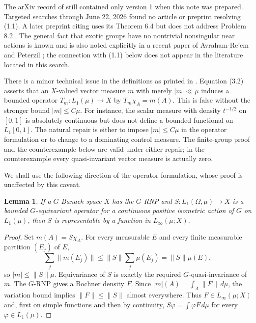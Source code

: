 \documentclass[11pt]{article}
\newtheorem{lemma}[theorem]{Lemma}
\theoremstyle{remark}
\begin{document}
The arXiv record of \cite{DDJR} still contained only version 1 when this note
was prepared.  Targeted searches through June 22, 2026 found no article or
preprint resolving (1.1).  A later preprint citing \cite{DDJR} uses its
Theorem 6.4 but does not address Problem 8.2 \cite{Daugavet}.  The general
fact that exotic groups have no nontrivial nonsingular near actions is known
and is also noted explicitly in a recent paper of Avraham-Re'em and Peterzil
\cite{AP}; the connection with (1.1) below does not appear in the literature
located in this search.

There is a minor technical issue in the definitions as printed in
\cite{DDJR}.  Equation (3.2) asserts that an $X$-valued vector measure $m$
with merely $|m|\ll\mu$ induces a bounded operator
$T_m:L_1(\mu)\to X$ by $T_m\chi_A=m(A)$.  This is false without the stronger
bound $|m|\leq C\mu$.  For instance, the scalar measure with density
$t^{-1/2}$ on $[0,1]$ is absolutely continuous but does not define a bounded
functional on $L_1[0,1]$.  The natural repair is either to impose
$|m|\leq C\mu$ in the operator formulation or to change to a dominating
control measure.  The finite-group proof and the counterexample below are
valid under either repair; in the counterexample every quasi-invariant
vector measure is actually zero.

We shall use the following direction of the operator formulation, whose proof
is unaffected by this caveat.

\begin{lemma}\label{lem:operator-direction}
If a $G$-Banach space $X$ has the $G$-RNP and
$S:L_1(\Omega,\mu)\to X$ is a bounded $G$-equivariant operator for a
continuous positive isometric action of $G$ on $L_1(\mu)$, then $S$ is
representable by a function in $L_\infty(\mu;X)$.
\end{lemma}

\begin{proof}
Set $m(A)=S\chi_A$.  For every measurable $E$ and every finite measurable
partition $(E_j)$ of $E$,
\[
  \sum_j\|m(E_j)\|
  \leq \|S\|\sum_j\mu(E_j)=\|S\|\mu(E),
\]
so $|m|\leq\|S\|\mu$.  Equivariance of $S$ is exactly the required
$G$-quasi-invariance of $m$.  The $G$-RNP gives a Bochner density $F$.
Since $|m|(A)=\int_A\|F\|\,d\mu$, the variation bound implies
$\|F\|\leq\|S\|$ almost everywhere.  Thus $F\in L_\infty(\mu;X)$ and,
first on simple functions and then by continuity,
$S\varphi=\int\varphi F\,d\mu$ for every $\varphi\in L_1(\mu)$.
\end{proof}
\end{document}
